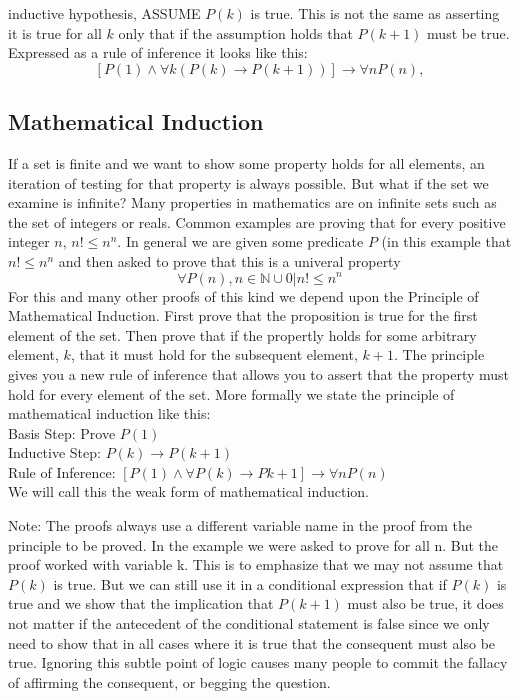     inductive hypothesis, ASSUME $P(k)$ is true. This is not the same as asserting it is true for all $k$ only that if the assumption holds that $P(k+1)$ must be true.
Expressed as a rule of inference it looks like this:
$$[P(1) \land \forall k (P(k) \rightarrow P(k+1))] \rightarrow \forall n P(n),$$














  \subsection {Mathematical Induction}
If a set is finite and we want to show some property holds for all elements, an iteration of testing for that property is always possible. But what if the set we examine is infinite? Many properties in mathematics are on infinite sets such as the set of integers or reals. Common examples are proving that for every positive integer $n$, $n! \leq n^n$. In general we are given some predicate $P$ (in this example that $n! \leq n^n$ and then asked to prove that this is a univeral property
$$\forall P(n), n\in \mathbb{N} \cup {0} | n! \leq n^n$$
For this and many other proofs of this kind we depend upon the Principle of Mathematical Induction. First prove that the proposition is true for the first element of the set. Then prove that if the propertly holds for some arbitrary element, $k$, that it must hold for the subsequent element, $k+1$. The principle gives you a new rule of inference that allows you to assert that the property must hold for every element of the set. More formally we state the principle of mathematical induction like this:\\
Basis Step: Prove $P(1)$ \\
Inductive Step: $P(k) \rightarrow P(k+1)$\\
Rule of Inference: $[P(1) \land \forall P(k) \rightarrow P{k+1}] \rightarrow \forall n P(n)$\\

We will call this the weak form of mathematical induction.

Note: The proofs always use a different variable name in the proof from the principle to be proved. In the example we were asked to prove for all n. But the proof worked with variable k. This is to emphasize that we may not assume that $P(k)$ is true. But we can still use it in a conditional expression that if $P(k)$ is true and we show that the implication that $P(k+1)$ must also be true, it does not matter if the antecedent of the conditional statement is false since we only need to show that in all cases where it is true that the consequent must also be true. Ignoring this subtle point of logic causes many people to commit the fallacy of affirming the consequent, or begging the question.


